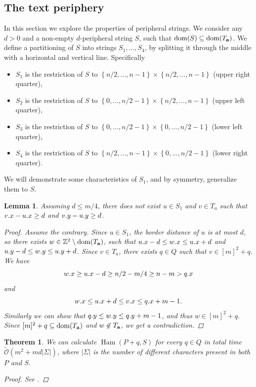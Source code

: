 \documentclass[11pt]{article}
\newcommand{\Z}{\mathbb{Z}}
\newcommand{\tO}{\tilde{\mathcal{O}}}
\newcommand{\set}[1]{\left\lbrace #1 \right\rbrace}
\theoremstyle{plain}
\newtheorem{theorem}{Theorem}
\newtheorem{lemma}{Lemma}
\theoremstyle{definition}
\theoremstyle{remark}
\DeclareMathOperator*{\Ham}{Ham}
\begin{document}
\subsection{The text periphery}
In this section we explore the properties of peripheral strings.
We consider any $d > 0$ and a non-empty $d$-peripheral string $S$, such that $\operatorname*{dom}(S) \subseteq \operatorname*{dom}(T_\mathbf{a})$.
We define a partitioning of $S$ into strings $S_1, \dots, S_4$, by splitting it through the middle with a horizontal and vertical line. 
Specifically
\begin{itemize}
	\item $S_1$ is the restriction of $S$ to $\set{n / 2, \dots, n - 1} \times \set{n / 2, \dots, n - 1}$ (upper right quarter),
	\item $S_2$ is the restriction of $S$ to $\set{0, \dots, n / 2 - 1} \times \set{n / 2, \dots, n - 1}$ (upper left quarter),
	\item $S_3$ is the restriction of $S$ to $\set{0, \dots, n / 2 - 1} \times \set{0, \dots, n / 2 - 1}$ (lower left quarter),
	\item $S_4$ is the restriction of $S$ to $\set{n / 2, \dots, n - 1} \times \set{0, \dots, n / 2 - 1}$ (lower right quarter).
\end{itemize}
We will demonstrate some characteristics of $S_1$, and by symmetry, generalize them to $S$.

\begin{lemma} \label{border_lemma}
	Assuming $d \le m/4$, there does not exist $u \in S_1$ and $v \in T_a$ such that $v.x - u.x \ge d$ and $v.y - u.y \ge d$.
	\begin{proof}
		Assume the contrary.
		Since $u \in S_1$, the border distance of $u$ is at most $d$, so there exists $w \in \Z^2 \setminus \d{\Ta}$, such that
		$u.x - d \le w.x \le u.x + d$ and
		$u.y - d \le w.y \le u.y + d$.
		Since $v \in T_a$, there exists $q \in Q$ such that $v \in [m]^2 + q$.
		We have
		\[ w.x \ge u.x - d \ge n / 2 - m / 4 \ge n - m > q.x \]
		and
		\[ w.x \le u.x + d \le v.x \le q.x + m - 1. \]
		Similarly we can show that $q.y \le w.y \le q.y + m - 1$, and thus $w \in [m]^2 + q$.
		Since $[m]^2 + q \subseteq \operatorname*{dom}(T_\mathbf{a})$ and $w \not \in T_\mathbf{a}$, we get a contradiction.
	\end{proof}
\end{lemma}

\begin{theorem}\label{sigma_border}
	We can calculate $\Ham(P + q, S)$ for every $q \in Q$ in total time $\tO(m^2 + md |\Sigma|)$, where $|\Sigma|$ is the number of different characters present in both $P$ and $S$.
	\begin{proof} See . \end{proof}
\end{theorem}
\end{document}
